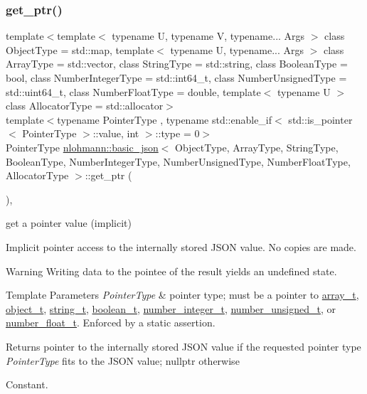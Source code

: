 \subsubsection{\texorpdfstring{get\+\_\+ptr()}{get\_ptr()}\hspace{0.1cm}{\footnotesize\ttfamily [1/2]}}
{\footnotesize\ttfamily template$<$template$<$ typename U, typename V, typename... Args $>$ class Object\+Type = std\+::map, template$<$ typename U, typename... Args $>$ class Array\+Type = std\+::vector, class String\+Type  = std\+::string, class Boolean\+Type  = bool, class Number\+Integer\+Type  = std\+::int64\+\_\+t, class Number\+Unsigned\+Type  = std\+::uint64\+\_\+t, class Number\+Float\+Type  = double, template$<$ typename U $>$ class Allocator\+Type = std\+::allocator$>$ \\
template$<$typename Pointer\+Type , typename std\+::enable\+\_\+if$<$ std\+::is\+\_\+pointer$<$ Pointer\+Type $>$\+::value, int $>$\+::type  = 0$>$ \\
Pointer\+Type \hyperlink{classnlohmann_1_1basic__json}{nlohmann\+::basic\+\_\+json}$<$ Object\+Type, Array\+Type, String\+Type, Boolean\+Type, Number\+Integer\+Type, Number\+Unsigned\+Type, Number\+Float\+Type, Allocator\+Type $>$\+::get\+\_\+ptr (\begin{DoxyParamCaption}{ }\end{DoxyParamCaption})\hspace{0.3cm}{\ttfamily [inline]}, {\ttfamily [noexcept]}}



get a pointer value (implicit) 

Implicit pointer access to the internally stored J\+S\+ON value. No copies are made.

\begin{DoxyWarning}{Warning}
Writing data to the pointee of the result yields an undefined state.
\end{DoxyWarning}

\begin{DoxyTemplParams}{Template Parameters}
{\em Pointer\+Type} & pointer type; must be a pointer to \hyperlink{classnlohmann_1_1basic__json_ab00b882d39306d663c23dab110f5cae0}{array\+\_\+t}, \hyperlink{classnlohmann_1_1basic__json_a0ac9894c9de8dc551cf2e5f1c605537f}{object\+\_\+t}, \hyperlink{classnlohmann_1_1basic__json_ab63e618bbb0371042b1bec17f5891f42}{string\+\_\+t}, \hyperlink{classnlohmann_1_1basic__json_af3bc3e83aa162d7ba4df16a949872723}{boolean\+\_\+t}, \hyperlink{classnlohmann_1_1basic__json_ac4b10b2364f26ce47bdb9a413ff04a59}{number\+\_\+integer\+\_\+t}, \hyperlink{classnlohmann_1_1basic__json_a60a04166c122072ab11eaf9845d9cd1d}{number\+\_\+unsigned\+\_\+t}, or \hyperlink{classnlohmann_1_1basic__json_a74a0013e847fdc574b48f931f0e757e1}{number\+\_\+float\+\_\+t}. Enforced by a static assertion.\\
\hline
\end{DoxyTemplParams}
\begin{DoxyReturn}{Returns}
pointer to the internally stored J\+S\+ON value if the requested pointer type {\itshape Pointer\+Type} fits to the J\+S\+ON value; {\ttfamily nullptr} otherwise
\end{DoxyReturn}
Constant.

